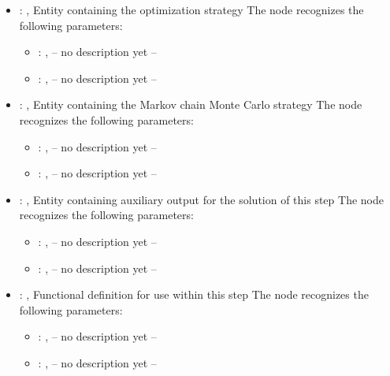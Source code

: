 \begin{itemize}
    \item {}: , 
      Entity containing the optimization strategy
      The  node recognizes the following parameters:
        \begin{itemize}
          \item {}: , 
            -- no description yet --
          \item {}: , 
            -- no description yet --
      \end{itemize}

    \item {}: , 
      Entity containing the Markov chain Monte Carlo strategy
      The  node recognizes the following parameters:
        \begin{itemize}
          \item {}: , 
            -- no description yet --
          \item {}: , 
            -- no description yet --
      \end{itemize}

    \item {}: , 
      Entity containing auxiliary output for the solution of this step
      The  node recognizes the following parameters:
        \begin{itemize}
          \item {}: , 
            -- no description yet --
          \item {}: , 
            -- no description yet --
      \end{itemize}

    \item {}: , 
      Functional definition for use within this step
      The  node recognizes the following parameters:
        \begin{itemize}
          \item {}: , 
            -- no description yet --
          \item {}: , 
            -- no description yet --
      \end{itemize}
  \end{itemize}
